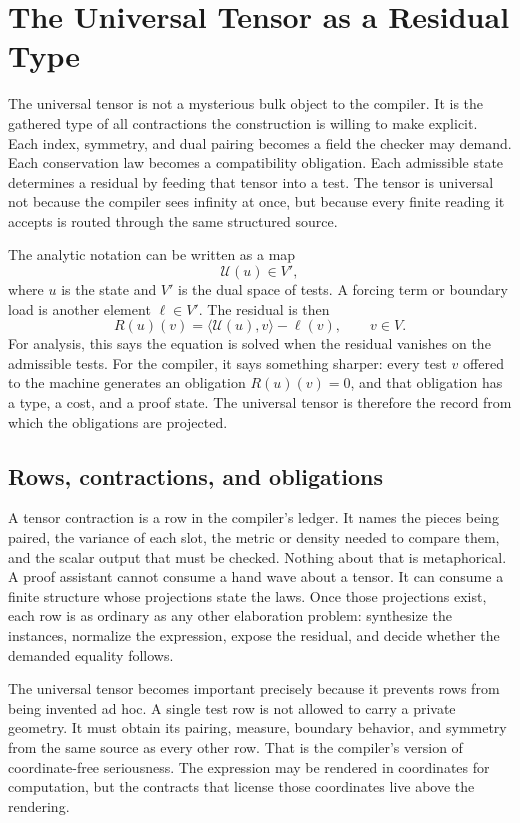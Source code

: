 \chapter{The Universal Tensor as a Residual Type}
\label{chap:universal-tensor-residual-type}

The universal tensor is not a mysterious bulk object to the compiler. It is the gathered type of all
contractions the construction is willing to make explicit. Each index, symmetry, and dual pairing becomes
a field the checker may demand. Each conservation law becomes a compatibility obligation. Each admissible
state determines a residual by feeding that tensor into a test. The tensor is universal not because the
compiler sees infinity at once, but because every finite reading it accepts is routed through the same
structured source.

The analytic notation can be written as a map
\[
  \mathcal U(u) \in V',
\]
where \(u\) is the state and \(V'\) is the dual space of tests. A forcing term or boundary load is another
element \(\ell \in V'\). The residual is then
\[
  R(u)(v) = \langle \mathcal U(u), v\rangle - \ell(v),
  \qquad v\in V .
\]
For analysis, this says the equation is solved when the residual vanishes on the admissible tests. For the
compiler, it says something sharper: every test \(v\) offered to the machine generates an obligation
\(R(u)(v)=0\), and that obligation has a type, a cost, and a proof state. The universal tensor is therefore
the record from which the obligations are projected.

\section{Rows, contractions, and obligations}
\label{se:rows-contractions-obligations}

A tensor contraction is a row in the compiler's ledger. It names the pieces being paired, the variance of
each slot, the metric or density needed to compare them, and the scalar output that must be checked. Nothing
about that is metaphorical. A proof assistant cannot consume a hand wave about a tensor. It can consume a
finite structure whose projections state the laws. Once those projections exist, each row is as ordinary as
any other elaboration problem: synthesize the instances, normalize the expression, expose the residual, and
decide whether the demanded equality follows.

The universal tensor becomes important precisely because it prevents rows from being invented ad hoc. A
single test row is not allowed to carry a private geometry. It must obtain its pairing, measure, boundary
behavior, and symmetry from the same source as every other row. That is the compiler's version of
coordinate-free seriousness. The expression may be rendered in coordinates for computation, but the
contracts that license those coordinates live above the rendering.

